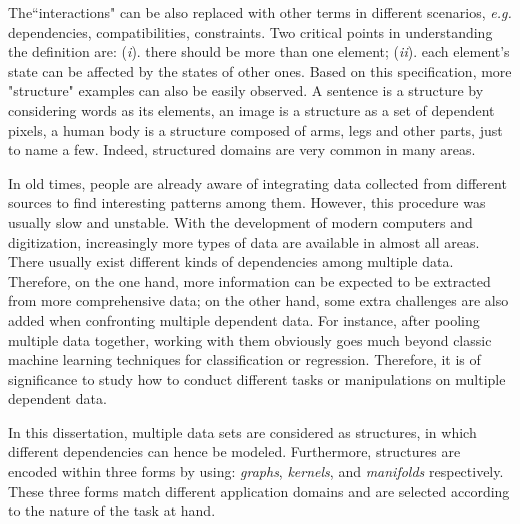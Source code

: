 The``interactions" can be also replaced with other terms in different scenarios, \emph{e.g.} dependencies, compatibilities, constraints. 
Two critical points in understanding the definition are: (\emph{i}). there should be more than one element; (\emph{ii}). each element's state can be affected by the states of other ones.  
Based on this specification, 
more "structure" 
examples can also be easily observed. A sentence is a structure by considering words as its elements, an image is a structure as a set of dependent pixels, a human body is a structure composed of 
arms, legs and other parts, just to name a few. Indeed, structured domains are very common in many areas.  


In old times, people are already aware of integrating data collected from different sources to find interesting patterns among them.     
However, this procedure was usually slow and unstable.  
With the development of modern computers and digitization, increasingly more types of data are available in almost all areas.  
There usually exist different kinds of dependencies among multiple data. Therefore, on the one hand, more information can be expected to be extracted  
from more comprehensive data; on the other hand, some extra challenges are also added when confronting multiple dependent data.      
For instance, after pooling multiple data together, working with them obviously goes much beyond classic machine learning techniques for classification 
or regression.
Therefore, it is of significance to study how to conduct different tasks or manipulations on multiple dependent data.          

In this dissertation, multiple data sets are considered as structures, in which different dependencies can 
hence be modeled. Furthermore, structures are encoded within three forms by using: \emph{graphs}, 
\emph{kernels}, and \emph{manifolds} respectively. These three forms match different application domains and are selected 
according to the nature of the task at hand.  


